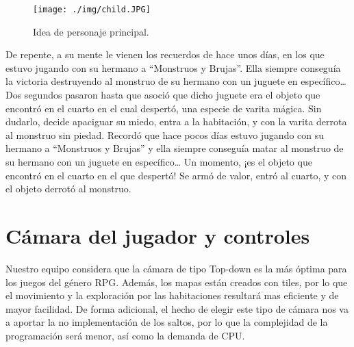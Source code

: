 \begin{figure}[!htb]
  \centering
    \texttt{[image: ./img/child.JPG]}
    \caption{Idea de personaje principal.}
  \label{fig:yo}
\end{figure}
\newline
De repente, a su mente le vienen los recuerdos de hace unos días, en los que estuvo jugando con su hermano a “Monstruos y Brujas”. Ella siempre conseguía la victoria  destruyendo al monstruo de su hermano con un juguete en específico… 
Dos segundos pasaron hasta que asoció que dicho juguete era el objeto que encontró en el cuarto en el cual despertó, una especie de varita mágica. Sin dudarlo, decide apaciguar su miedo, entra a la habitación, y con la varita derrota al monstruo sin piedad. \newline
\newline
Recordó que hace pocos días estuvo jugando con su hermano a “Monstruos y Brujas” y ella siempre conseguía matar al monstruo de su hermano con un juguete en específico… \newline
\newline
Un momento, ¡es el objeto que encontró en el cuarto en el que despertó! Se armó de valor, entró al cuarto, y con el objeto derrotó al monstruo.

\section{Cámara del jugador y controles}

Nuestro equipo considera que la cámara de tipo Top-down es la más óptima para los juegos del género RPG. Además, los mapas están creados con tiles, por lo que el movimiento y la exploración por las habitaciones resultará mas eficiente y de mayor facilidad. De forma adicional, el hecho de elegir este tipo de cámara nos va a aportar la no implementación de los saltos, por lo que la complejidad de la programación será menor, así como la demanda de CPU. 


